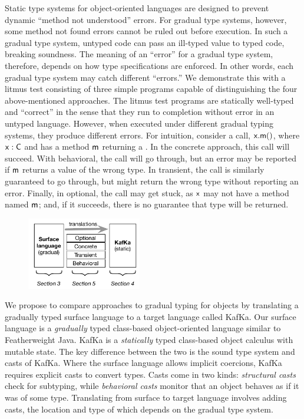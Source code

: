 \documentclass[a4paper,USenglish]{lipics-v2018}
\newcommand{\EM}[1]{\ensuremath{#1}\xspace}
\newcommand{\xt}[1]{{\sf{#1}}}
\newcommand{\EMxt}[1]{\EM{\xt{#1}}}
\newcommand{\x}{\EMxt x}
\newcommand{\m}{\EMxt m}
\newcommand{\kafka}{{\sf KafKa}\xspace}
\begin{document}
Static type systems for object-oriented languages are designed to prevent dynamic ``method not understood'' errors. For
gradual type systems, however, some method not found errors cannot be ruled out before
execution. In such a gradual type system, untyped code can pass an ill-typed value to typed code, breaking soundness. 
The meaning of an ``error'' for a gradual type system, therefore, depends on how type specifications are
enforced. In other words, each gradual type system may catch different
``errors.'' We demonstrate this with a litmus test consisting of three
simple programs capable of distinguishing the four above-mentioned
approaches. The litmus test programs are statically well-typed and
``correct'' in the sense that they run to completion without error in an
untyped language. However, when executed under different gradual typing
systems, they produce different errors. For intuition, consider a call,
\EM{\x.\m()}, where \EM{\x:\C} and \C has a method \m returning a \D. In
the concrete approach, this call will succeed. With behavioral, the call
will go through, but an error may be reported if \m returns a value of the
wrong type. In transient, the call is similarly guaranteed to go through,
but might return the wrong type without reporting an error. Finally, in
optional, the call may get stuck, as \x may not have a method named \m; and,
if it succeeds, there is no guarantee that type \D will be returned.

\begin{figure}
\vspace{-6mm}
\includegraphics[width=5cm]{fig1}
\vspace{-8mm}\end{figure}

We propose to compare approaches to gradual typing for objects by
translating a gradually typed surface language to a target language called
\kafka. Our surface language is a \emph{gradually} typed class-based object-oriented 
language similar to Featherweight Java. \kafka is a
\emph{statically} typed class-based object calculus with mutable state. The
key difference between the two is the sound type system and casts of \kafka.
Where the surface language allows implicit coercions, \kafka requires
explicit casts to convert types. Casts come in two kinds: \emph{structural
casts} check for subtyping, while \emph{behavioral casts} monitor that an
object behaves as if it was of some type. Translating from surface to target
language involves adding casts, the location and type of which depends on
the gradual type system.
\end{document}
